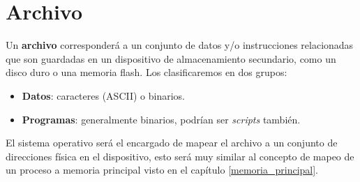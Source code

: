 \section{Archivo}

Un \textbf{archivo} corresponderá a un conjunto de datos y/o instrucciones
relacionadas que son guardadas en un dispositivo de almacenamiento secundario,
como un disco duro o una memoria flash. Los clasificaremos en dos grupos:

\begin{itemize}
\item \textbf{Datos}: caracteres (ASCII) o binarios.
\item \textbf{Programas}: generalmente binarios, podrían ser \textit{scripts}
también.
\end{itemize}

El sistema operativo será el encargado de mapear el archivo a un conjunto de
direcciones física en el dispositivo, esto será muy similar al concepto de mapeo
de un proceso a memoria principal visto en el capítulo \ref{memoria_principal}.

